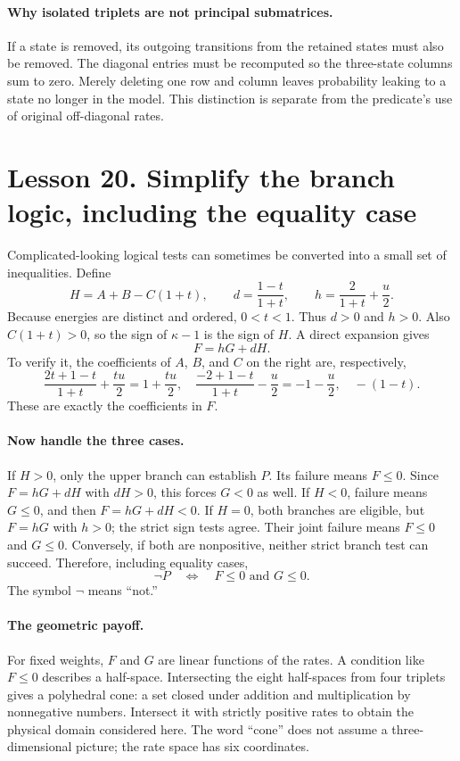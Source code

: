 \documentclass[11pt]{article}
\begin{document}
\paragraph{Why isolated triplets are not principal submatrices.}
If a state is removed, its outgoing transitions from the retained states
must also be removed. The diagonal entries must be recomputed so the
three-state columns sum to zero. Merely deleting one row and column leaves
probability leaking to a state no longer in the model. This distinction is
separate from the predicate's use of original off-diagonal rates.

\clearpage
\section*{Lesson 20. Simplify the branch logic, including the equality case}
Complicated-looking logical tests can sometimes be converted into a small
set of inequalities. Define
\[
H=A+B-C(1+t),\qquad d=\frac{1-t}{1+t},
\qquad h=\frac2{1+t}+\frac u2.
\]
Because energies are distinct and ordered, $0<t<1$. Thus $d>0$ and $h>0$.
Also $C(1+t)>0$, so the sign of $\kappa-1$ is the sign of $H$.
A direct expansion gives
\[
F=hG+dH.
\]
To verify it, the coefficients of $A$, $B$, and $C$ on the right are,
respectively,
\[
\frac{2t+1-t}{1+t}+\frac{tu}{2}=1+\frac{tu}{2},
\quad\frac{-2+1-t}{1+t}-\frac u2=-1-\frac u2,
\quad-(1-t).
\]
These are exactly the coefficients in $F$.

\paragraph{Now handle the three cases.}
If $H>0$, only the upper branch can establish $P$. Its failure means
$F\leq0$. Since $F=hG+dH$ with $dH>0$, this forces $G<0$ as well.
If $H<0$, failure means $G\leq0$, and then $F=hG+dH<0$.
If $H=0$, both branches are eligible, but $F=hG$ with $h>0$; the strict
sign tests agree. Their joint failure means $F\leq0$ and $G\leq0$.
Conversely, if both are nonpositive, neither strict branch test can succeed.
Therefore, including equality cases,
\[
\neg P\quad\Longleftrightarrow\quad F\leq0\text{ and }G\leq0.
\]
The symbol $\neg$ means ``not.''

\paragraph{The geometric payoff.}
For fixed weights, $F$ and $G$ are linear functions of the rates. A condition
like $F\leq0$ describes a half-space. Intersecting the eight half-spaces from
four triplets gives a polyhedral cone: a set closed under addition and
multiplication by nonnegative numbers. Intersect it with strictly positive
rates to obtain the physical domain considered here. The word ``cone'' does
not assume a three-dimensional picture; the rate space has six coordinates.
\end{document}
